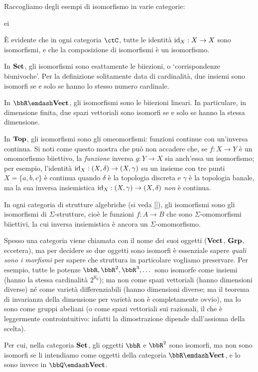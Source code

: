 \begin{examples}
 Raccogliamo degli esempi di isomorfismo in varie categorie:%
 \begin{enumtag}{ei}
    \item \`E evidente che in ogni categoria $\ctC$, tutte le identità $\mathrm{id}_X : X\to X$ sono isomorfismi, e che la composizione di isomorfismi è un isomorfismo.
  \item In $\mathbf{Set}$, gli isomorfismi sono esattamente le biiezioni, o `corrispondenze biunivoche'. Per la definizione solitamente data di cardinalità, due insiemi sono isomorfi se e solo se hanno lo stesso numero cardinale.
  \item In $\bbR\emdash\ctVect$, gli isomorfismi sono le biiezioni lineari. In particulare, in dimensione finita, due spazi vettoriali sono isomorfi se e solo se hanno la stessa dimensione.
  \item In $\mathbf{Top}$, gli isomorfismi sono gli omeomorfismi: funzioni continue con un'inversa continua. Si noti come questo mostra che può non accadere che, se $f : X\to Y$ è un omomorfismo biiettivo, la \emph{funzione} inversa $g : Y\to X$ sia anch'essa un isomorfismo; per esempio, l'identità $\mathrm{id}_X : (X,\delta)\to (X,\gamma)$ su un insieme con tre punti $X=\{a,b,c\}$ è continua quando $\delta$ è la topologia discreta e $\gamma$ è la topologia banale, ma la sua inversa insiemistica $\mathrm{id}_X : (X,\gamma)\to(X,\delta)$ \emph{non} è continua.
  \item In ogni categoria di strutture algebriche (si veda \autoref{}), gli isomorfismi sono gli isomorfismi di $\Sigma$-strutture, cioè le funzioni $f : A\to B$ che sono $\Sigma$-omomorfismi biiettivi, la cui inversa insiemistica è ancora un $\Sigma$-omomorfismo.
 \end{enumtag}
\end{examples}
\begin{warning}
 Spesso una categoria viene chiamata con il nome dei suoi oggetti ($\mathbf{Vect}$, $\mathbf{Grp}$, eccetera), ma per decidere se due oggetti sono isomorfi è essenziale sapere \emph{quali sono i morfismi} per sapere che struttura in particolare vogliamo preservare. Per esempio, tutte le potenze $\bbR,\bbR^2,\bbR^3,\dots$ sono isomorfe come insiemi (hanno la stessa cardinalità $2^{\aleph_0}$); ma non come spazi vettoriali (hanno dimensioni diverse) né come varietà differenziabili (hanno dimensioni diverse; ma il teorema di invarianza della dimensione per varietà non è completamente ovvio), ma lo sono come gruppi abeliani (o come spazi vettoriali sui razionali, il che è leggermente controintuitivo: infatti la dimostrazione dipende dall'assioma della scelta).

 Per cui, nella categoria $\mathbf{Set}$, gli oggetti $\bbR$ e $\bbR^2$ sono isomorfi, ma non sono isomorfi se li intendiamo come oggetti della categoria $\bbR\emdash\ctVect$, e lo sono invece in $\bbQ\emdash\ctVect$.
\end{warning}
